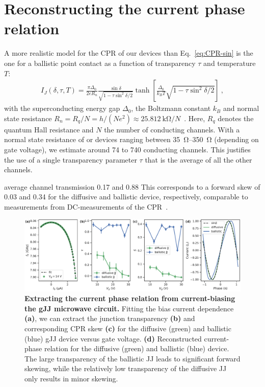 \section{Reconstructing the current phase relation}

A more realistic model for the CPR of our devices than Eq.~\ref{eq:CPR-sin} is the one for a ballistic point contact as a function of transparency $\tau$ and temperature $T$:
%
\begin{align}
I_J(\delta,\tau,T) = \frac{\pi\Delta_0}{2 e R_n} \frac{\sin\delta}{\sqrt{1 - \tau \sin^2\delta / 2}} \tanh\left[\frac{\Delta_0}{k_B T} \sqrt{1 - \tau \sin^2\delta / 2}\right]\ ,
\label{eq:CPR-ball}
\end{align}
%
with the superconducting energy gap $\Delta_0$, the Boltzmann constant $k_B$ and normal state resistance $R_n= R_q/N = h/(Ne^2)\approx \SI{25.812}{\kilo\ohm} / N$~\cite{golubovCurrentphaseRelationJosephson2004a}.
%
Here, $R_q$ denotes the quantum Hall resistance and $N$ the number of conducting channels.
%
With a normal state resistance of or devices ranging between \SIrange{35}{350}{\ohm} (depending on gate voltage), we estimate around 74 to 740 conducting channels.
%
This justifies the use of a single transparency parameter $\tau$ that is the average of all the other channels.

average channel transmission 0.17 and 0.88
This corresponds to a forward skew of 0.03 and 0.34 for the diffusive and ballistic device, respectively, comparable to measurements from DC-measurements of the CPR~\cite{englishObservationNonsinusoidalCurrentphase2016,nandaCurrentPhaseRelationBallistic2017}.
%
%

\begin{figure}
	\centering
	\includegraphics[width=\linewidth]{chapter-gJJ-CPR/figs/Figure5}
	\caption{
		\textbf{Extracting the current phase relation from current-biasing the gJJ microwave circuit.}
		Fitting the bias current dependence \textbf{(a)}, we can extract the junction transparency \textbf{(b)} and corresponding CPR skew \textbf{(c)} for the diffusive (green) and ballistic (blue) gJJ device versus gate voltage.
		\textbf{(d)} Reconstructed current-phase relation for the diffusive (green) and ballistic (blue) device.
		The large transparency of the ballistic JJ leads to significant forward skewing, while the relatively low transparency of the diffusive JJ only results in minor skewing.
	}
	\label{fig:figure5}
\end{figure}

